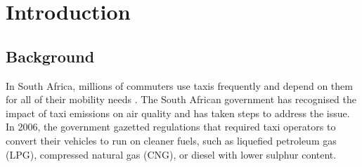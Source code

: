 \graphicspath{{introduction/fig/}}

\chapter{Introduction}
\label{chap:introduction}

\section{Background}
In South Africa, millions of commuters use taxis frequently and depend on them for all of their mobility needs \cite{depttransport2023}. The South African government has recognised the impact of taxi emissions on air quality and has taken steps to address the issue. In 2006, the government gazetted regulations that required taxi operators to convert their vehicles to run on cleaner fuels, such as liquefied petroleum gas (LPG), compressed natural gas (CNG), or diesel with lower sulphur content\cite{2007Comparison}. 

